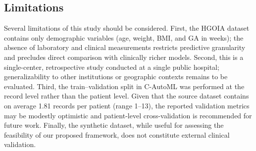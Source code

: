 \documentclass[diagnostics,article,accept,pdftex,moreauthors]{Definitions/mdpi}
\begin{document}
\subsection{Limitations}
\label{sec:limitations}

{Several} %
limitations of this study should be considered.  First, the \ac{HGOIA}
dataset contains only demographic variables (age, weight, \ac{BMI},
and \ac{GA} {in} %
weeks); the absence of laboratory and clinical
measurements restricts predictive granularity and precludes direct comparison
with clinically richer models.
Second, this is a single-center, retrospective study conducted at a single
public hospital; generalizability to other institutions or geographic contexts
remains to be evaluated.
Third, the train--validation split in \ac{C-AutoML} was performed at the record
level rather than the patient level. Given that the source dataset contains on
average 1.81 records per patient (range 1--13), the reported
validation metrics may be modestly optimistic and patient-level
cross-validation is recommended for future work.
Finally, the synthetic dataset, while useful for assessing the
feasibility of our proposed framework, does not constitute external clinical validation.

\end{document}
